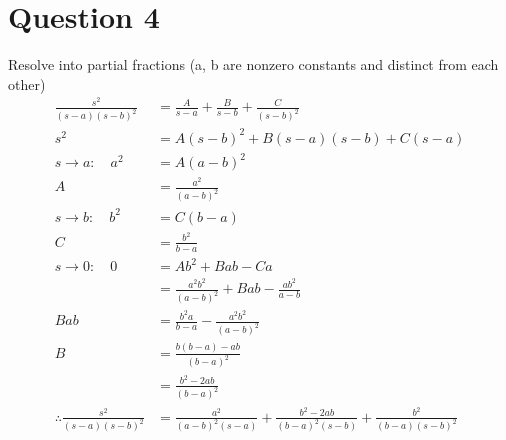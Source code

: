 \documentclass{article}
\begin{document}
\section*{Question 4}
Resolve into partial fractions (a, b are nonzero constants and distinct from each other)
\begin{align*}
    \frac{s^2}{(s-a)(s-b)^2}            & = \frac{A}{s-a}+\frac{B}{s-b}+\frac{C}{(s-b)^2}                                  \\
    s^2                                 & = A(s-b)^2+B(s-a)(s-b)+C(s-a)                                                    \\
    s\to a:\quad a^2                    & = A(a-b)^2                                                                       \\
    A                                   & = \frac{a^2}{(a-b)^2}                                                            \\
    s\to b:\quad b^2                    & = C(b-a)                                                                         \\
    C                                   & = \frac{b^2}{b-a}                                                                \\
    s\to 0:\quad 0                      & = Ab^2+Bab-Ca                                                                    \\
                                        & = \frac{a^2b^2}{(a-b)^2}+Bab-\frac{ab^2}{a-b}                                    \\
    Bab                                 & = \frac{b^2a}{b-a}-\frac{a^2b^2}{(a-b)^2}                                        \\
    B                                   & = \frac{b(b-a)-ab}{(b-a)^2}                                                      \\
                                        & = \frac{b^2-2ab}{(b-a)^2}                                                        \\
    \therefore \frac{s^2}{(s-a)(s-b)^2} & = \frac{a^2}{(a-b)^2(s-a)}+\frac{b^2-2ab}{(b-a)^2(s-b)}+\frac{b^2}{(b-a)(s-b)^2}
\end{align*}
\end{document}
